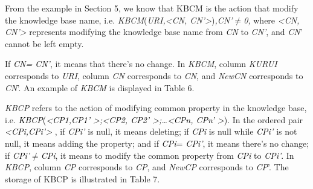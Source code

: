 \documentclass{elsarticle}
\begin{document}
\textrm{From the example in Section 5, we know that KBCM is the action
that modify the knowledge base name, i.e.
}\textrm{\textit{KBCM}}\textrm{(}\textrm{\textit{URI,{\textless}CN,
CN'{\textgreater}}}\textrm{)}\textrm{\textit{,CN'${\neq}$0,
}}\textrm{where }\textrm{\textit{{\textless}CN,
CN'{\textgreater}}}\textrm{ represents modifying the knowledge base
name from }\textrm{\textit{CN}}\textrm{ to
}\textrm{\textit{CN'}}\textrm{, and
}\textrm{\textit{CN}}\textrm{' cannot be left empty.}


\textrm{If }\textrm{\textit{\textcolor{black}{CN= CN'}}}\textrm{, it
means that there's no change. In
}\textrm{\textit{KBCM}}\textrm{, column
}\textrm{\textit{KURUI}}\textrm{ corresponds to
}\textrm{\textit{URI}}\textrm{, column }\textrm{\textit{CN
}}\textrm{corresponds to}\textrm{\textit{ CN}}\textrm{, and
}\textrm{\textit{NewCN}}\textrm{ corresponds to
}\textrm{\textit{CN}}\textrm{'. An example
of}\textrm{\textit{ KBCM}}\textrm{ is displayed in Table 6.}


\textrm{\textit{KBCP}}\textrm{ refers to the action of modifying common
property in the knowledge base, i.e.
}\textrm{\textit{\textcolor{black}{KBCP}}}\textrm{\textcolor{black}{(}}\textrm{\textit{\textcolor{black}{{\textless}CP1,CP1'
{\textgreater};{\textless}CP2, CP2'
{\textgreater};…{\textless}CPn, CPn'
{\textgreater}}}}\textrm{\textcolor{black}{)}}\textrm{. In the ordered
pair
}\textrm{\textit{\textcolor{black}{{\textless}CPi,CPi'}}}\textit{\textcolor{black}{{\textgreater}}}\textrm{
, if }\textrm{\textit{\textcolor{black}{CPi' }}}\textrm{is null, it
means deleting; if }\textrm{\textit{\textcolor{black}{CPi}}}\textrm{ is
null while }\textrm{\textit{\textcolor{black}{CPi' }}}\textrm{is not
null, it means adding the property; and if
}\textrm{\textit{\textcolor{black}{CPi}}}\textrm{=}\textrm{\textit{\textcolor{black}{
CPi'}}}\textrm{\textcolor{black}{,}}\textrm{ it means
there's no change; if
}\textrm{\textit{\textcolor{black}{CPi'${\neq}$CPi}}}\textrm{, it means
to modify the common property from
}\textrm{\textit{\textcolor{black}{CPi}}}\textrm{ to
}\textrm{\textit{\textcolor{black}{CPi'}}}\textrm{\textcolor{black}{.
}}\textrm{In }\textrm{\textit{KBCP}}\textrm{, column
}\textrm{\textit{CP }}\textrm{corresponds to}\textrm{\textit{
CP}}\textrm{, and }\textrm{\textit{NewCP }}\textrm{corresponds to
}\textrm{\textit{CP}}\textrm{'. The storage of KBCP is
illustrated in Table 7.}
\end{document}
